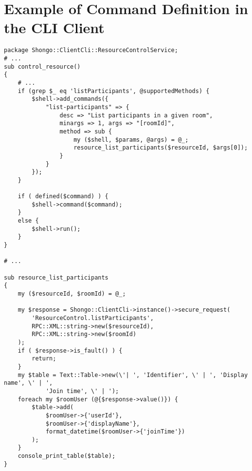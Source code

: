 \section{Example of Command Definition in the CLI Client} \label{appendix:cli-client-command-def-example}
{ \small
\begin{verbatim}
package Shongo::ClientCli::ResourceControlService;
# ...
sub control_resource()
{
    # ...
    if (grep $_ eq 'listParticipants', @supportedMethods) {
        $shell->add_commands({
            "list-participants" => {
                desc => "List participants in a given room",
                minargs => 1, args => "[roomId]",
                method => sub {
                    my ($shell, $params, @args) = @_;
                    resource_list_participants($resourceId, $args[0]);
                }
            }
        });
    }

    if ( defined($command) ) {
        $shell->command($command);
    }
    else {
        $shell->run();
    }
}

# ...

sub resource_list_participants
{
    my ($resourceId, $roomId) = @_;

    my $response = Shongo::ClientCli->instance()->secure_request(
        'ResourceControl.listParticipants',
        RPC::XML::string->new($resourceId),
        RPC::XML::string->new($roomId)
    );
    if ( $response->is_fault() ) {
        return;
    }
    my $table = Text::Table->new(\'| ', 'Identifier', \' | ', 'Display name', \' | ',
            'Join time', \' | ');
    foreach my $roomUser (@{$response->value()}) {
        $table->add(
            $roomUser->{'userId'},
            $roomUser->{'displayName'},
            format_datetime($roomUser->{'joinTime'})
        );
    }
    console_print_table($table);
}
\end{verbatim}
}



